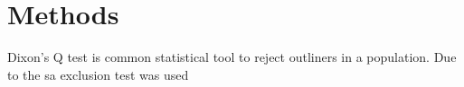 \chapter{Methods}

Dixon's Q test is common statistical tool to reject outliners in a population. Due to the sa exclusion test was used 